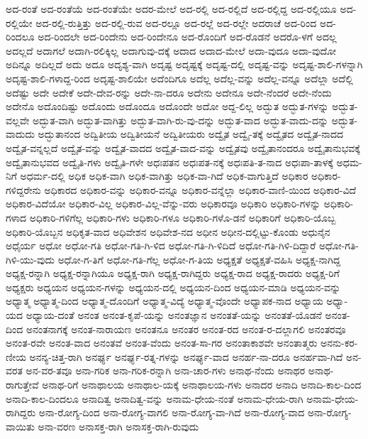 {ಅದ-ರಂತೆ
ಅದ-ರಂತೆಯೆ
ಅದ-ರಂತೆಯೇ
ಅದರ-ಮೇಲೆ
ಅದ-ರಲ್ಲಿ
ಅದ-ರಲ್ಲಿದೆ
ಅದ-ರಲ್ಲಿದ್ದ
ಅದ-ರಲ್ಲಿಯೂ
ಅದ-ರಲ್ಲಿಯೇ
ಅದ-ರಲ್ಲಿ-ರುತ್ತಿತ್ತು
ಅದ-ರಲ್ಲಿ-ರುವ
ಅದ-ರಲ್ಲೂ
ಅದ-ರಲ್ಲೆ
ಅದ-ರಲ್ಲೇ
ಅದರಾಚೆ
ಅದ-ರಿಂದ
ಅದ-ರಿಂದಲೂ
ಅದ-ರಿಂದಲೇ
ಅದ-ರಿಂದೇನು
ಅದ-ರಿಂದೇನೂ
ಅದ-ರೊಂದಿಗೆ
ಅದ-ರೊಡನೆ
ಅದರೊ-ಳಗೆ
ಅದಲ್ಲ
ಅದಲ್ಲದೆ
ಅದಾಗಲೆ
ಅದಾಗಿ-ರಲಿಕ್ಕಿಲ್ಲ
ಅದಾಗುವು-ದಕ್ಕೆ
ಅದಾದ
ಅದಾದ-ಮೇಲೆ
ಅದಾ-ವುದೂ
ಅದಾ-ವುದೋ
ಅದಿನ್ನೂ
ಅದಿಲ್ಲದೆ
ಅದು
ಅದೂ
ಅದೃಶ್ಯ-ವಾಗಿ
ಅದೃಷ್ಟ
ಅದೃಷ್ಟಕ್ಕೆ
ಅದೃಷ್ಟ-ದಲ್ಲಿ
ಅದೃಷ್ಟ-ವನ್ನು
ಅದೃಷ್ಟ-ಶಾಲಿ-ಗಳನ್ನಾಗಿ
ಅದೃಷ್ಟ-ಶಾಲಿ-ಗಳಾದ್ದ-ರಿಂದ
ಅದೃಷ್ಟ-ಶಾಲಿಯೇ
ಅದೆಂದಿಗೂ
ಅದೆಲ್ಲ
ಅದೆಲ್ಲ-ವನ್ನು
ಅದೆಲ್ಲ-ವನ್ನೂ
ಅದೆಲ್ಲಾ
ಅದೆಲ್ಲಿ
ಅದೆಷ್ಟು
ಅದೇ
ಅದೇಕೆ
ಅದೇ-ದೇವ-ರನ್ನು
ಅದೇ-ನಾ-ದರೂ
ಅದೇನು
ಅದೇನೂ
ಅದೇ-ನೆಂದರೆ
ಅದೇ-ನೆಂದು
ಅದೇನೊ
ಅದೊಂದಿಷ್ಟು
ಅದೊಂದು
ಅದೊಂದೂ
ಅದೊಂದೇ
ಅದೋ
ಅದ್ದ-ಲಿಲ್ಲ
ಅದ್ಭುತ
ಅದ್ಭುತ-ಗಳನ್ನು
ಅದ್ಭುತ-ವಲ್ಲವೇ
ಅದ್ಭುತ-ವಾಗಿ
ಅದ್ಭುತ-ವಾಗಿತ್ತು
ಅದ್ಭುತ-ವಾಗಿ-ರು-ವು-ದನ್ನು
ಅದ್ಭುತ-ವಾದ
ಅದ್ಭುತ-ವಾದು-ದನ್ನು
ಅದ್ಭುತ-ವಾದುದು
ಅದ್ಭುತಾನಂದ
ಅದ್ವಿತೀಯ
ಅದ್ವಿತೀಯನೆ
ಅದ್ವಿತೀಯರು
ಅದ್ವೈತ
ಅದ್ವೈ-ತಕ್ಕೆ
ಅದ್ವೈತದ
ಅದ್ವೈತ-ನಾದದ
ಅದ್ವೈತ-ವನ್ನಲ್ಲದೆ
ಅದ್ವೈತ-ವನ್ನು
ಅದ್ವೈತ-ವಾದದ
ಅದ್ವೈತ-ವಾದ-ವನ್ನು
ಅದ್ವೈತವು
ಅದ್ವೈತಾನಂದರೂ
ಅದ್ವೈತಾನುಭವಕ್ಕೆ
ಅದ್ವೈತಾನುಭವದ
ಅದ್ವೈತಿ-ಗಳು
ಅದ್ವೈತಿ-ಗಳೇ
ಅಧಃಪತನ
ಅಧಃಪತ-ನಕ್ಕೆ
ಅಧಃಪತಿ-ತ-ನಾದ
ಅಧಃಪಾ-ತಾಳಕ್ಕೆ
ಅಧಮ-ನಿಗೆ
ಅಧರ್ಮ-ದಲ್ಲಿ
ಅಧಿಕ
ಅಧಿಕ-ವಾಗಿ
ಅಧಿಕ-ವಾಗಿತ್ತು
ಅಧಿಕ-ವಾ-ಗಿದೆ
ಅಧಿಕ-ವಾಗುತ್ತಿದೆ
ಅಧಿಕಾರ
ಅಧಿಕಾರ-ಗಳಿದ್ದರೇನು
ಅಧಿಕಾರದ
ಅಧಿಕಾರ-ವನ್ನು
ಅಧಿಕಾರ-ವನ್ನೂ
ಅಧಿಕಾರ-ವನ್ನೆಲ್ಲಾ
ಅಧಿಕಾರ-ವಾಣಿ-ಯಿಂದ
ಅಧಿಕಾರ-ವಿದೆ
ಅಧಿಕಾರ-ವಿದೆಯೋ
ಅಧಿಕಾರ-ವಿಲ್ಲ
ಅಧಿಕಾರ-ವಿಲ್ಲ-ವೆನ್ನು-ವರು
ಅಧಿಕಾರವೂ
ಅಧಿಕಾರಿ
ಅಧಿಕಾರಿ-ಗಳನ್ನು
ಅಧಿಕಾರಿ-ಗಳಾದ
ಅಧಿಕಾರಿ-ಗಳಿಗೆಲ್ಲ
ಅಧಿಕಾರಿ-ಗಳು
ಅಧಿಕಾರಿ-ಗಳೂ
ಅಧಿಕಾರಿ-ಗಳೊ-ಡನೆ
ಅಧಿಕಾರಿಗೆ
ಅಧಿಕಾರಿ-ಯೊಬ್ಬ
ಅಧಿಕಾರಿ-ಯೊಬ್ಬನ
ಅಧಿಕೃತ-ವಾದ
ಅಧಿವೇಶನ
ಅಧಿವೇಶ-ನದ
ಅಧೀನ
ಅಧೀನ-ದಲ್ಲಿಟ್ಟು-ಕೊಂಡು
ಅಧುನೈನ
ಅಧೈರ್ಯ
ಅಧೋ
ಅಧೋ-ಗತಿ
ಅಧೋ-ಗತಿ-ಗಿ-ಳಿದ
ಅಧೋ-ಗತಿ-ಗಿ-ಳಿದಿದೆ
ಅಧೋ-ಗತಿ-ಗಿಳಿ-ದಿದ್ದಾರೆ
ಅಧೋ-ಗತಿ-ಗಿಳಿ-ಯು-ವುದು
ಅಧೋ-ಗ-ತಿಗೆ
ಅಧೋ-ಗತಿ-ಗೆಲ್ಲ
ಅಧೋ-ಗ-ತಿಯ
ಅಧ್ಯಕ್ಷತೆ
ಅಧ್ಯಕ್ಷತೆ-ವಹಿಸಿ
ಅಧ್ಯಕ್ಷ-ನಾಗಿದ್ದ
ಅಧ್ಯಕ್ಷ-ರನ್ನಾಗಿ
ಅಧ್ಯಕ್ಷ-ರನ್ನಾಗಿಯೂ
ಅಧ್ಯಕ್ಷ-ರಾಗಿ
ಅಧ್ಯಕ್ಷ-ರಾಗಿದ್ದರು
ಅಧ್ಯಕ್ಷ-ರಾದ
ಅಧ್ಯಕ್ಷ-ರಾದರು
ಅಧ್ಯಕ್ಷ-ರಿಗೆ
ಅಧ್ಯಕ್ಷರು
ಅಧ್ಯಯನ
ಅಧ್ಯಯನ-ಗಳನ್ನು
ಅಧ್ಯಯನ-ದಲ್ಲಿ
ಅಧ್ಯಯನ-ದಿಂದ
ಅಧ್ಯಯನ-ಮಾಡಿ
ಅಧ್ಯಯನ-ವನ್ನು
ಅಧ್ಯಾತ್ಮ
ಅಧ್ಯಾತ್ಮ-ದಿಂದ
ಅಧ್ಯಾತ್ಮ-ದೊಂದಿಗೆ
ಅಧ್ಯಾತ್ಮ-ವಿದ್ಯೆ
ಅಧ್ಯಾತ್ಮ-ವೊಂದೇ
ಅಧ್ಯಾಪಕ-ನಾದ
ಅಧ್ಯಾಯ
ಅಧ್ಯಾ-ಯದ
ಅಧ್ಯಾಯ-ದಂತೆ
ಅನಂತ
ಅನಂತ-ಕೃಪೆ-ಯನ್ನು
ಅನಂತಜ್ಞಾನ
ಅನಂತತೆ-ಯನ್ನು
ಅನಂತತೆ-ಯೊಡನೆ
ಅನಂತ-ದಿಂದ
ಅನಂತನಾಗಕ್ಕೆ
ಅನಂತ-ನಾರಾಯಣ
ಅನಂತನೂ
ಅನಂತರ
ಅನಂತ-ರದ
ಅನಂತ-ರ-ದಲ್ಲಾಗಲಿ
ಅನಂತರವೂ
ಅನಂತ-ರವೇ
ಅನಂತ-ವಾದ
ಅನಂತವೆ
ಅನಂತ-ವೆಂದು
ಅನಂತ-ಸಾ-ಗರ
ಅನಂತಾಕಾಶವೇ
ಅನಂತಾತ್ಮರು
ಅನನು-ಕರ-ಣೀಯ
ಅನನ್ಯ-ಚಿತ್ತ-ರಾಗಿ
ಅನರ್ಘ್ಯ
ಅನರ್ಘ್ಯ-ರತ್ನ-ಗಳನ್ನು
ಅನರ್ಘ್ಯ-ವಾದ
ಅನರ್ಹ-ನಾ-ದರೂ
ಅನರ್ಹವಾ-ಗಿದೆ
ಅನ-ವರತ
ಅನ-ವರ-ತವೂ
ಅನಾ-ಗರಿಕ
ಅನಾ-ಗರಿಕ-ರನ್ನಾಗಿ
ಅನಾ-ಚಾರ-ಗಳು
ಅನಾಥ-ನೆಂದು
ಅನಾಥರ
ಅನಾಥ-ರಾಗುತ್ತೇವೆ
ಅನಾಥ-ರಿಗೆ
ಅನಾಥಾಲಯ
ಅನಾಥಾಲ-ಯಕ್ಕೆ
ಅನಾಥಾಲಯ-ಗಳು
ಅನಾದರ
ಅನಾದಿ
ಅನಾದಿ-ಕಾಲ-ದಿಂದ
ಅನಾದಿ-ಕಾಲ-ದಿಂದಲೂ
ಅನಾದಿತ್ವ
ಅನಾದಿತ್ವ-ವನ್ನು
ಅನಾಮ-ಧೇಯ-ನಂತೆ
ಅನಾಮ-ಧೇಯ-ರಾಗಿ
ಅನಾಮ-ಧೇಯ-ರಾಗಿದ್ದರು
ಅನಾ-ರೋಗ್ಯ-ದಿಂದ
ಅನಾ-ರೋಗ್ಯ-ವಾಗಲಿ
ಅನಾ-ರೋಗ್ಯ-ವಾ-ಗಿದೆ
ಅನಾ-ರೋಗ್ಯ-ವಾದ
ಅನಾ-ರೋಗ್ಯ-ವಾಯಿತು
ಅನಾ-ವರಣ
ಅನಾಸಕ್ತ-ರಾಗಿ
ಅನಾಸಕ್ತ-ರಾಗಿ-ರುವುದು
}
